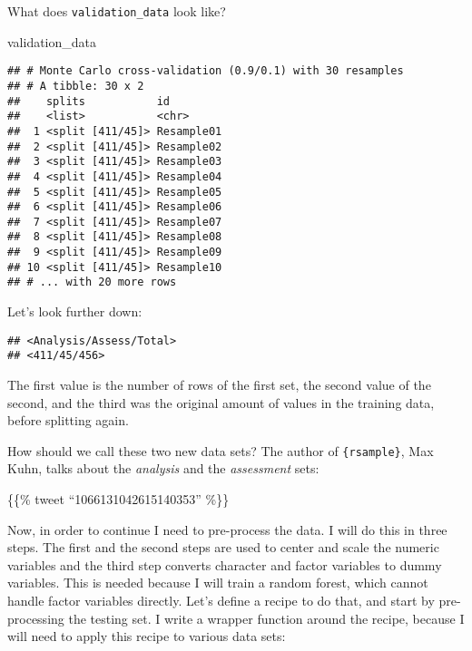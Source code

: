 \documentclass[
]{article}
\newenvironment{Shaded}{\begin{snugshade}}{\end{snugshade}}
\newcommand{\DecValTok}[1]{\textcolor[rgb]{0.00,0.00,0.81}{#1}}
\newcommand{\NormalTok}[1]{#1}
\newcommand{\OperatorTok}[1]{\textcolor[rgb]{0.81,0.36,0.00}{\textbf{#1}}}
\begin{document}
What does \texttt{validation\_data} look like?

\begin{Shaded}
\begin{Highlighting}[]
\NormalTok{validation\_data}
\end{Highlighting}
\end{Shaded}

\begin{verbatim}
## # Monte Carlo cross-validation (0.9/0.1) with 30 resamples  
## # A tibble: 30 x 2
##    splits           id        
##    <list>           <chr>     
##  1 <split [411/45]> Resample01
##  2 <split [411/45]> Resample02
##  3 <split [411/45]> Resample03
##  4 <split [411/45]> Resample04
##  5 <split [411/45]> Resample05
##  6 <split [411/45]> Resample06
##  7 <split [411/45]> Resample07
##  8 <split [411/45]> Resample08
##  9 <split [411/45]> Resample09
## 10 <split [411/45]> Resample10
## # ... with 20 more rows
\end{verbatim}

Let's look further down:

\begin{Shaded}
\end{Shaded}

\begin{verbatim}
## <Analysis/Assess/Total>
## <411/45/456>
\end{verbatim}

The first value is the number of rows of the first set, the second value of the second, and the third
was the original amount of values in the training data, before splitting again.

How should we call these two new data sets? The author of \texttt{\{rsample\}}, Max Kuhn, talks about
the \emph{analysis} and the \emph{assessment} sets:

\{\{\% tweet ``1066131042615140353'' \%\}\}

Now, in order to continue I need to pre-process the data. I will do this in three steps.
The first and the second steps are used to center and scale the numeric variables and the third step
converts character and factor variables to dummy variables. This is needed because I will train a
random forest, which cannot handle factor variables directly. Let's define a recipe to do that,
and start by pre-processing the testing set. I write a wrapper function around the recipe,
because I will need to apply this recipe to various data sets:
\end{document}
